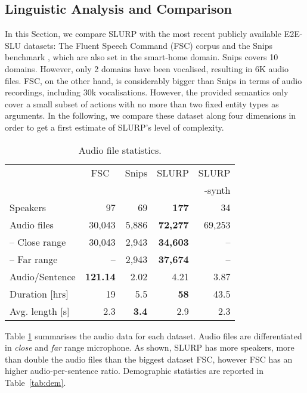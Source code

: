 \documentclass[11pt,a4paper]{article}
\newcommand{\datasetacr}{SLURP}
\newcommand{\etoe}{E2E}
\newcommand{\slu}{SLU}
\begin{document}
\subsection{Linguistic Analysis and Comparison}
\label{subsec:comparison}
In this Section, we compare \datasetacr{} with the most recent publicly available \etoe-\slu{} datasets: The Fluent Speech Command (FSC) corpus \cite{lugosh19:Interspeech} and the Snips benchmark \cite{Coucke18:Snips}, which are also set in the smart-home domain.
 Snips covers 10 domains. However, only 2 domains
have been vocalised, resulting in \texttildelow6K audio files. FSC, on the other hand, is considerably bigger than Snips in terms of audio recordings, including \texttildelow30k vocalisations. However, the provided semantics only cover a small subset of actions with no more than two fixed entity types as arguments.
In the following, we compare these dataset along 
four dimensions in order to get a first estimate of \datasetacr's level of complexity. 


\begin{table}[t]
    \centering
    \footnotesize
    \begin{tabular}{lrrrr}
\hline
         &    \multicolumn{1}{c}{FSC} &   \multicolumn{1}{c}{Snips} &    \multicolumn{1}{c}{\datasetacr} &   \multicolumn{1}{c}{\datasetacr}\\
         &    &    &   & -synth\\
\hline
 Speakers      &    97    &   69    &  {\bf 177}  &     34    \\
 Audio files         & 30,043    & 5,886    & \textbf{72,277}    &     69,253\\
 \; -- Close range &    30,043    &  2,943    & \textbf{34,603}    &      --\\
 \; -- Far range     &    --    &   2,943    & \textbf{37,674}    &     --\\
 Audio/Sentence  &   \textbf{121.14} &    2.02 &     4.21 &        3.87\\
 Duration [hrs] & 19 & 5.5 & \textbf{58} & 43.5  \\
 Avg. length [s] & 2.3 & \textbf{3.4} & 2.9 & 2.3 \\
\hline
\end{tabular}
    \caption{Audio file statistics.} \label{tab:audio}
\end{table}

 Table \ref{tab:audio} 
summarises 
the audio data for each dataset. Audio files are differentiated in \textit{close} and \textit{far} range microphone. As shown, \datasetacr{} has  more speakers, more than double the audio files than the biggest dataset FSC, however FSC has an higher
audio-per-sentence ratio. Demographic statistics are reported in Table~\ref{tab:dem}. 
\end{document}
